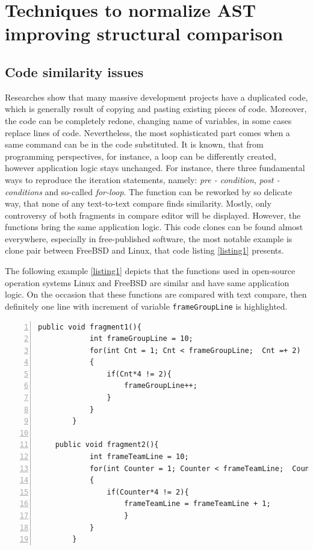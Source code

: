 \documentclass{report}
\begin{document}


%

\chapter{Techniques to normalize AST improving structural comparison}
\label{cha:ast_normal}
\section{Code similarity issues}
Researches show that many massive development projects have a duplicated code, which is generally result of copying and pasting existing pieces of code. Moreover, the code can be completely redone, changing name of variables, in some cases replace lines of code. Nevertheless, the most sophisticated part comes when a same command can be in the code substituted. It is known, that from programming perspectives, for instance, a loop can be differently created, however application logic stays unchanged. For instance, there three fundamental ways to reproduce the iteration statements, namely: \emph{pre - condition}, \emph{post - conditions} and so-called \emph{for-loop}. The function can be reworked by so delicate way, that none of any text-to-text compare finds similarity. Mostly, only controversy of both fragments in compare editor will be displayed.
However, the functions bring the same application logic. This code clones can be found almost everywhere, especially in free-published software, the most notable example is clone pair between FreeBSD and Linux, that code listing \ref{listing1} presents. 

The following example \ref{listing1} depicts that the functions used in open-source operation systems Linux and FreeBSD are similar and have same application logic. On the occasion that these functions are compared with text compare, then definitely one line with increment of variable \texttt{frameGroupLine} is highlighted. 
\newpage
\begin{lstlisting}[caption={Clone pair between FreeBSD and Linux.}, label = listing1, numbers=left, numbersep=-5pt]
	public void fragment1(){
			int frameGroupLine = 10;
			for(int Cnt = 1; Cnt < frameGroupLine;  Cnt =+ 2)
			{
				if(Cnt*4 != 2){
					frameGroupLine++;
				}
			}
		}
			
	public void fragment2(){
			int frameTeamLine = 10;
			for(int Counter = 1; Counter < frameTeamLine;  Counter =+ 2)
			{
				if(Counter*4 != 2){ 
					frameTeamLine = frameTeamLine + 1;
					}
			}
		}	
\end{lstlisting}
\end{document}
